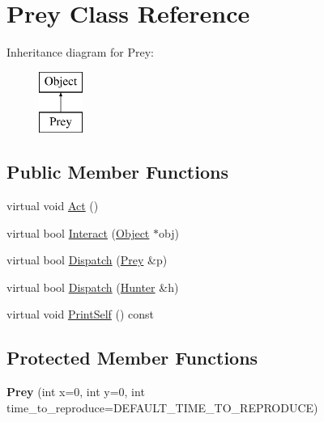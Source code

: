 \hypertarget{classPrey}{
\section{Prey Class Reference}
\label{classPrey}
}
Inheritance diagram for Prey:\begin{figure}[H]
\begin{center}
\leavevmode
\includegraphics[height=2cm]{classPrey}
\end{center}
\end{figure}
\subsection*{Public Member Functions}
\begin{DoxyCompactItemize}
\item 
virtual void \hyperlink{classPrey_a940c0a8879376b15dedb7debf9b8f1c8}{Act} ()
\item 
virtual bool \hyperlink{classPrey_a3f46445d442e33d47edcc94bf5f537b4}{Interact} (\hyperlink{classObject}{Object} $\ast$obj)
\item 
virtual bool \hyperlink{classPrey_a1c9491af7144879d4eb0a63e5de4d6b9}{Dispatch} (\hyperlink{classPrey}{Prey} \&p)
\item 
virtual bool \hyperlink{classPrey_ae1ad92ee4416c74c45a5e4098ba5e327}{Dispatch} (\hyperlink{classHunter}{Hunter} \&h)
\item 
virtual void \hyperlink{classPrey_a46d5447bf01e734154f8d3f2f27c8fcd}{PrintSelf} () const 
\end{DoxyCompactItemize}
\subsection*{Protected Member Functions}
\begin{DoxyCompactItemize}
\item 
\hypertarget{classPrey_a1e65463a2ed66b174fcd735676b0d68e}{
{\bfseries Prey} (int x=0, int y=0, int time\_\-to\_\-reproduce=DEFAULT\_\-TIME\_\-TO\_\-REPRODUCE)}
\label{classPrey_a1e65463a2ed66b174fcd735676b0d68e}

\end{DoxyCompactItemize}
